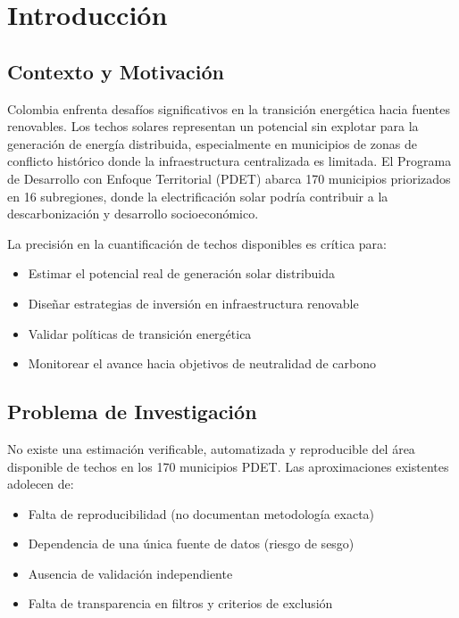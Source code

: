 \documentclass[11pt, a4paper]{article}
\begin{document}
\newpage
\newpage


\section{Introducción}

\subsection{Contexto y Motivación}

Colombia enfrenta desafíos significativos en la transición energética hacia fuentes renovables. Los techos solares representan un potencial sin explotar para la generación de energía distribuida, especialmente en municipios de zonas de conflicto histórico donde la infraestructura centralizada es limitada. El Programa de Desarrollo con Enfoque Territorial (PDET) abarca 170 municipios priorizados en 16 subregiones, donde la electrificación solar podría contribuir a la descarbonización y desarrollo socioeconómico.

La precisión en la cuantificación de techos disponibles es crítica para:
\begin{itemize}
    \item Estimar el potencial real de generación solar distribuida
    \item Diseñar estrategias de inversión en infraestructura renovable
    \item Validar políticas de transición energética
    \item Monitorear el avance hacia objetivos de neutralidad de carbono
\end{itemize}

\subsection{Problema de Investigación}

No existe una estimación verificable, automatizada y reproducible del área disponible de techos en los 170 municipios PDET. Las aproximaciones existentes adolecen de:
\begin{itemize}
    \item Falta de reproducibilidad (no documentan metodología exacta)
    \item Dependencia de una única fuente de datos (riesgo de sesgo)
    \item Ausencia de validación independiente
    \item Falta de transparencia en filtros y criterios de exclusión
\end{itemize}
\end{document}
